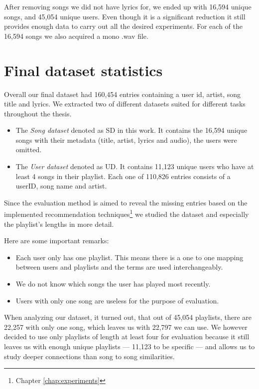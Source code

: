 After removing songs we did not have lyrics for, we ended up with 16,594 unique songs, and 45,054 unique users. Even though it is a significant reduction it still provides enough data to carry out all the desired experiments. For each of the 16,594 songs we also acquired a mono .wav
file. 

\section{Final dataset statistics}
Overall our final dataset had 160,454 entries containing a user id, artist, song title and lyrics. We extracted two of different datasets suited for different tasks throughout the thesis.
\begin{itemize}
    \item The \textit{Song dataset} denoted as SD in this work. It contains the
    16,594 unique songs with their metadata (title, artist, lyrics and audio), the users were omitted.
    \item The \textit{User dataset} denoted as UD. It contains 11,123 unique users who have at least 4 songs in their playlist. Each one of 110,826 entries consists of a userID, song name and artist. 
\end{itemize}
 Since the evaluation method is aimed to reveal the missing entries based on the
 implemented recommendation techniques\footnote{Chapter \ref{chap:experiments}} we studied the dataset and especially the playlist's
 lengths in more detail.
 
Here are some important remarks:
\begin{itemize}
    \item Each user only has one playlist. This means there is a one to one mapping between users and playlists and the terms are used interchangeably.
    \item We do not know which songs the user has played most recently.
    \item Users with only one song are useless for the purpose of evaluation.
\end{itemize} 
When analyzing our dataset, it turned out, that out of 45,054 playlists, there are 22,257 with only one song, which leaves us with 22,797 we can use. We however decided to use only playlists of length at least four for evaluation because it still leaves us with enough unique playlists --- 11,123 to be specific --- and allows us to study deeper connections than song to song similarities. 

